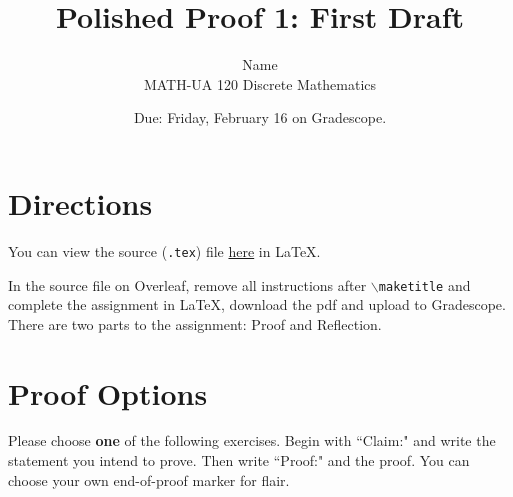 \documentclass{article}
\title{Polished Proof 1: First Draft}
\author{%
	Name
	\\
	MATH-UA 120 Discrete Mathematics
}
\date{Due: Friday, February 16 on Gradescope.}
\theoremstyle{definition}
\begin{document}
    \maketitle
	
\section*{Directions}
    You can view the source (\texttt{.tex}) file \href{https://bit.ly/3UqVQnS}{here} in \LaTeX.
    
    In the source file on Overleaf, remove all instructions after \texttt{$\backslash$maketitle} and complete the assignment in \LaTeX, 
    download the pdf and upload to Gradescope. There are two parts to the assignment: Proof and Reflection.

\section*{Proof Options}
    Please choose \textbf{one} of the following exercises. Begin with ``Claim:" and write the statement you intend to prove. 
    Then write ``Proof:" and the proof. You can choose your own end-of-proof marker for flair.
\end{document}
